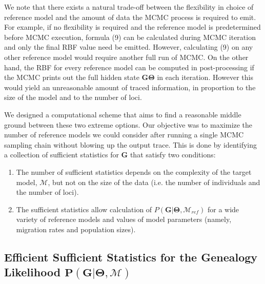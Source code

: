 \documentclass[11pt]{article}
\newcommand{\vect}[1]{\boldsymbol{\mathbf{#1}}}
\newcommand{\M}{\mathcal{M}}
\newcommand{\G}{\vect{G}}
\newcommand{\T}{\vect{\Theta}}
\newcommand{\GT}{\G\T}
\newcommand{\Mref}{\M_{ref}}
\newcommand{\1}{\mathbbm{1}}
\begin{document}
We note that there exists a natural trade-off between the flexibility in choice of reference model and the amount of data the MCMC process is required to emit. For example, if no flexibility is required and the reference model is predetermined before MCMC execution, formula (9) can be calculated during MCMC iteration and only the final RBF value need be emitted. However, calculating (9) on any other reference model would require another full run of MCMC.
%
On the other hand, the RBF for every reference model can be computed in post-processing if the MCMC prints out the full hidden state $\GT$ in each iteration.
%
However this would yield an unreasonable amount of traced information, in proportion to the size of the model and to the number of loci.


We designed a computational scheme that aims to find a reasonable middle ground between these two extreme options.
Our objective was to maximize the number of reference models we could consider after running a single MCMC sampling chain without blowing up the output trace.
This is done by identifying a collection of sufficient statistics for $\G$ that satisfy two conditions:
%
%
\begin{enumerate}
 \item The number of sufficient statistics depends on the complexity of the target model, $\M$, but not on the size of the data (i.e. the number of individuals and the number of loci).
 \item The sufficient statistics allow calculation of $P(\G|\T,\Mref)$ for a wide variety of reference models and values of model parameters (namely, migration rates and population sizes).
\end{enumerate}
%
%
\subsection{Efficient Sufficient Statistics for the Genealogy Likelihood $\mathbf{P(G|\Theta, \M)}$}
\end{document}
